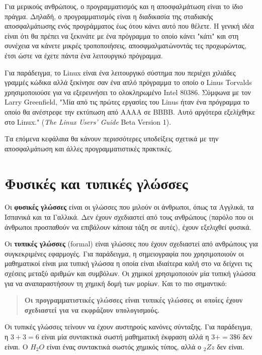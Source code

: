 \documentclass[10pt]{book}
\begin{document}
Για μερικούς ανθρώπους, ο προγραμματισμός και η αποσφαλμάτωση είναι το ίδιο
πράγμα. Δηλαδή, ο προγραμματισμός είναι η διαδικασία της σταδιακής
αποσφαλμάτωσης ενός προγράμματος έως ότου κάνει αυτό που θέλετε.   
Η γενική ιδέα είναι ότι θα πρέπει να ξεκινάτε με ένα πρόγραμμα το
οποίο κάνει "κάτι" και στη συνέχεια να κάνετε μικρές τροποποιήσεις, αποσφμαλματώνοντάς τες προχωρώντας, έτσι ώστε να έχετε πάντα ένα λειτουργικό πρόγραμμα.  

Για παράδειγμα, το Linux είναι ένα λειτουργικό σύστημα που
περιέχει χιλιάδες γραμμές κώδικα αλλά ξεκίνησε σαν ένα απλό πρόγραμμα
το οποίο ο Linus Torvalds χρησιμοποιούσε για να εξερευνήσει
το ολοκληρωμένο Intel 80386. Σύμφωνα με τον Larry Greenfield, "Μία από τις πρώτες εργασίες του Linus ήταν ένα πρόγραμμα το οποίο θα ανέστρεφε την εκτύπωση από ΑΑΑΑ σε ΒΒΒΒ. Αυτό αργότερα εξελίχθηκε στο Linux." ({\em The Linux Users' Guide} Beta Version 1).

Τα επόμενα κεφάλαια θα κάνουν περισσότερες υποδείξεις σχετικά με την αποσφαλμάτωση και άλλες προγραμματιστικές πρακτικές.


\section{Φυσικές και τυπικές γλώσσες}

Οι {\bf φυσικές γλώσσες} είναι οι γλώσσες που μιλούν οι άνθρωποι,
όπως τα Αγγλικά, τα Ισπανικά και τα Γαλλικά. Δεν έχουν σχεδιαστεί
από τους ανθρώπους (παρόλο που οι άνθρωποι προσπαθούν να επιβάλουν
κάποια τάξη σε αυτές), έχουν εξελιχθεί φυσικά.

Οι {\bf τυπικές γλώσσες} (formal) είναι γλώσσες που έχουν σχεδιαστεί από ανθρώπους για συγκεκριμένες εφαρμογές. Για παράδειγμα, η σημειογραφία που χρησιμοποιούν οι μαθηματικοί είναι μια τυπική γλώσσα η οποία είναι ιδιαίτερα καλή στο να δείχνει τις σχέσεις μεταξύ αριθμών και συμβόλων. Οι χημικοί χρησιμοποιούν μία τυπική γλώσσα για να αναπαραστήσουν τη χημική δομή των μορίων. Και το πιο σημαντικό:

\begin{quote}
{\bf Οι προγραμματιστικές γλώσσες είναι τυπικές γλώσσες οι οποίες έχουν σχεδιαστεί για να εκφράζουν υπολογισμούς.}
\end{quote}

Οι τυπικές γλώσσες τείνουν να έχουν αυστηρούς κανόνες σύνταξης. Για
παράδειγμα, η $3 + 3 = 6$ είναι μία συντακτικά σωστή μαθηματική έκφραση αλλά 
η $3 + = 3 \mbox{\$} 6$ δεν είναι. Ο $H_2O$ είναι ένας συντακτικά σωστός
χημικός τύπος, αλλά ο $_2Zz$ δεν είναι.
\end{document}
